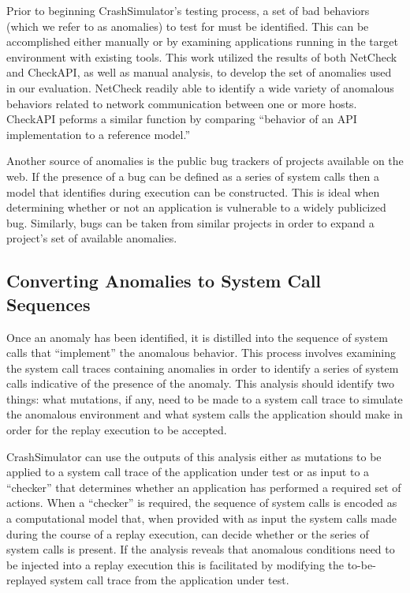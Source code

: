     Prior to beginning CrashSimulator's testing
    process, a set of bad behaviors (which we refer to as anomalies) to test for
    must be identified.  This can be accomplished either manually or by
    examining applications running in the target environment with existing
    tools.  This work utilized the results of both
    NetCheck\cite{Zhuang_NSDI_2014} and CheckAPI\cite{rasley2015detecting}, as
    well as manual analysis, to develop the set of anomalies used in our
    evaluation.  NetCheck readily able to identify a wide variety of anomalous
    behaviors related to network communication between one or more
    hosts.  CheckAPI peforms a similar function by comparing ``behavior of an API
    implementation to a reference model.''

    Another source of anomalies is the public bug trackers of projects available
    on the web.  If the presence of a bug can be defined as a series of system
    calls then a model that identifies during execution can be constructed. This
    is ideal when determining whether or not an application is vulnerable to a
    widely publicized bug.  Similarly, bugs can be taken from similar projects
    in order to expand a project's set of available anomalies.

    \subsection{Converting Anomalies to System Call Sequences}

    Once an anomaly has been identified, it is distilled into the sequence of
    system calls that ``implement'' the anomalous behavior.  This process
    involves examining the system call traces containing anomalies in order to
    identify a series of system calls indicative of the presence of the anomaly.
    This analysis should identify two things: what mutations, if any, need to be
    made to a system call trace to simulate the anomalous environment and what
    system calls the application should make in order for the replay execution
    to be accepted.

    CrashSimulator can use the outputs of this analysis either as mutations to
    be applied to a system call trace of the application under test or as input
    to a ``checker'' that determines whether an application has performed a
    required set of actions. When a ``checker'' is required, the sequence of
    system calls is encoded as a computational model that, when provided with as
    input the system calls made during the course of a replay execution, can
    decide whether or the series of system calls is present.  If the analysis
    reveals that anomalous conditions need to be injected into a replay
    execution this is facilitated by modifying the to-be-replayed system call
    trace from the application under test.

